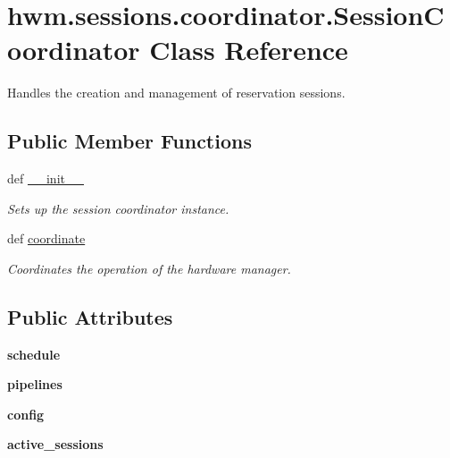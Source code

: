 \hypertarget{classhwm_1_1sessions_1_1coordinator_1_1_session_coordinator}{\section{hwm.\-sessions.\-coordinator.\-Session\-Coordinator Class Reference}
\label{classhwm_1_1sessions_1_1coordinator_1_1_session_coordinator}
}


Handles the creation and management of reservation sessions.  


\subsection*{Public Member Functions}
\begin{DoxyCompactItemize}
\item 
def \hyperlink{classhwm_1_1sessions_1_1coordinator_1_1_session_coordinator_aaaf071b58d2881b65a4e75c4ae2d00e7}{\-\_\-\-\_\-init\-\_\-\-\_\-}
\begin{DoxyCompactList}\small\item\em Sets up the session coordinator instance. \end{DoxyCompactList}\item 
def \hyperlink{classhwm_1_1sessions_1_1coordinator_1_1_session_coordinator_ab62005ec016aea7fe48a4e3b903c068a}{coordinate}
\begin{DoxyCompactList}\small\item\em Coordinates the operation of the hardware manager. \end{DoxyCompactList}\end{DoxyCompactItemize}
\subsection*{Public Attributes}
\begin{DoxyCompactItemize}
\item 
\hypertarget{classhwm_1_1sessions_1_1coordinator_1_1_session_coordinator_a76834ea9a0b948b9a17ddf5132db71b7}{{\bfseries schedule}}\label{classhwm_1_1sessions_1_1coordinator_1_1_session_coordinator_a76834ea9a0b948b9a17ddf5132db71b7}

\item 
\hypertarget{classhwm_1_1sessions_1_1coordinator_1_1_session_coordinator_a5232cdeb4846c6dbd5c5d289bbbb9171}{{\bfseries pipelines}}\label{classhwm_1_1sessions_1_1coordinator_1_1_session_coordinator_a5232cdeb4846c6dbd5c5d289bbbb9171}

\item 
\hypertarget{classhwm_1_1sessions_1_1coordinator_1_1_session_coordinator_a6b1a679930d8bc2ba4db35bb33598de2}{{\bfseries config}}\label{classhwm_1_1sessions_1_1coordinator_1_1_session_coordinator_a6b1a679930d8bc2ba4db35bb33598de2}

\item 
\hypertarget{classhwm_1_1sessions_1_1coordinator_1_1_session_coordinator_a3b240042f011015fb455a5edc5ecf766}{{\bfseries active\-\_\-sessions}}\label{classhwm_1_1sessions_1_1coordinator_1_1_session_coordinator_a3b240042f011015fb455a5edc5ecf766}

\end{DoxyCompactItemize}
